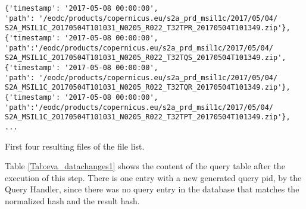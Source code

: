 \documentclass[draft,final]{vutinfth} %
\newenvironment{code}{\captionsetup{type=listing}}{}
\begin{document}
\begin{enumerate}
	\begin{code}
		\begin{verbatim}
{'timestamp': '2017-05-08 00:00:00', 
'path': '/eodc/products/copernicus.eu/s2a_prd_msil1c/2017/05/04/
S2A_MSIL1C_20170504T101031_N0205_R022_T32TPR_20170504T101349.zip'}, 
{'timestamp': '2017-05-08 00:00:00',
'path':'/eodc/products/copernicus.eu/s2a_prd_msil1c/2017/05/04/
S2A_MSIL1C_20170504T101031_N0205_R022_T32TQS_20170504T101349.zip', 
{'timestamp': '2017-05-08 00:00:00', 
'path': '/eodc/products/copernicus.eu/s2a_prd_msil1c/2017/05/04/
S2A_MSIL1C_20170504T101031_N0205_R022_T32TQR_20170504T101349.zip'}, 
{'timestamp': '2017-05-08 00:00:00',
'path':'/eodc/products/copernicus.eu/s2a_prd_msil1c/2017/05/04/
S2A_MSIL1C_20170504T101031_N0205_R022_T32TPT_20170504T101349.zip'},
...
		\end{verbatim}
		\caption{First four resulting files of the file list.}
		\label{lst:eva_datachange_rf1}
	\end{code}
	
	Table \ref{Tab:eva_datachanges1} shows the content of the query table after the execution of this step. There is one entry with a new generated query pid, by the Query Handler, since there was no query entry in the database that matches the normalized hash and the result hash. 
	
	

\end{enumerate}
\end{document}

